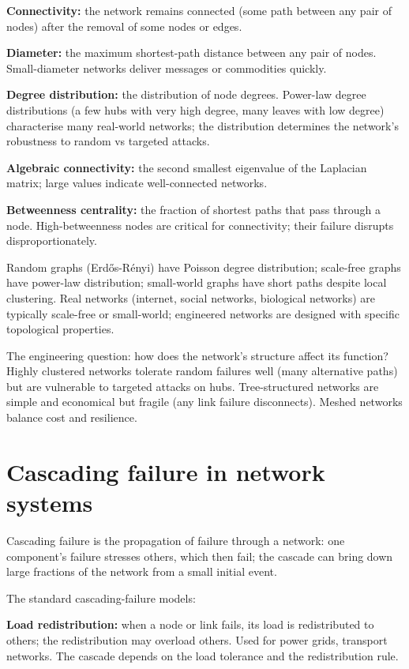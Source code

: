 \textbf{Connectivity:} the network remains connected (some path between any pair of nodes) after the removal of some nodes or edges.

\textbf{Diameter:} the maximum shortest-path distance between any pair of nodes. Small-diameter networks deliver messages or commodities quickly.

\textbf{Degree distribution:} the distribution of node degrees. Power-law degree distributions (a few hubs with very high degree, many leaves with low degree) characterise many real-world networks; the distribution determines the network's robustness to random vs targeted attacks.

\textbf{Algebraic connectivity:} the second smallest eigenvalue of the Laplacian matrix; large values indicate well-connected networks.

\textbf{Betweenness centrality:} the fraction of shortest paths that pass through a node. High-betweenness nodes are critical for connectivity; their failure disrupts disproportionately.

Random graphs (Erd\H{o}s-R\'enyi) have Poisson degree distribution; scale-free graphs have power-law distribution; small-world graphs have short paths despite local clustering. Real networks (internet, social networks, biological networks) are typically scale-free or small-world; engineered networks are designed with specific topological properties.

The engineering question: how does the network's structure affect its function? Highly clustered networks tolerate random failures well (many alternative paths) but are vulnerable to targeted attacks on hubs. Tree-structured networks are simple and economical but fragile (any link failure disconnects). Meshed networks balance cost and resilience.

\section{Cascading failure in network systems}

Cascading failure is the propagation of failure through a network: one component's failure stresses others, which then fail; the cascade can bring down large fractions of the network from a small initial event.

The standard cascading-failure models:

\textbf{Load redistribution:} when a node or link fails, its load is redistributed to others; the redistribution may overload others. Used for power grids, transport networks. The cascade depends on the load tolerance and the redistribution rule.

